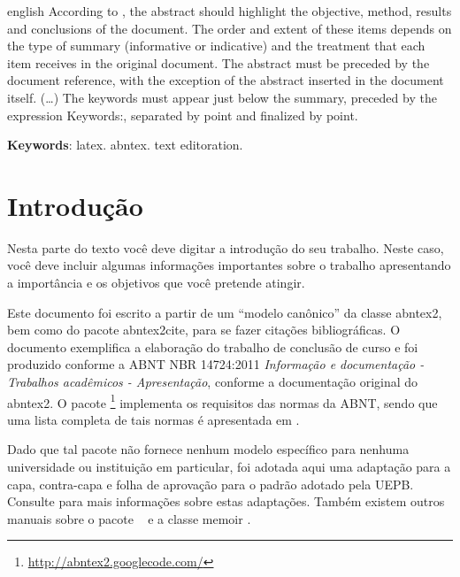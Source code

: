\documentclass[article,12pt,oneside,a4paper,chapter=TITLE,english,brazil]{abntex2}
\begin{document}
\begin{resumo}[Abstract]
	\begin{otherlanguage*}{english}
		According to , the abstract should highlight the objective, method, results and conclusions of the document. The order and extent of these items depends on the type of summary (informative or indicative) and the treatment that each item receives in the original document. The abstract must be preceded by the document reference, with the exception of the abstract inserted in the document itself. (\ldots) The keywords must appear just below the summary, preceded by the expression Keywords:, separated by point and finalized by point.
		
		\textbf{Keywords}: latex. abntex. text editoration.
	\end{otherlanguage*}
\end{resumo}
\vspace{\onelineskip}


\chapter{Introdução}
\label{introducao}

Nesta parte do texto você deve digitar a introdução do seu trabalho. Neste caso, você deve incluir algumas informações importantes sobre o trabalho apresentando a importância e os objetivos que você pretende atingir.

Este documento foi escrito a partir de um ``modelo canônico'' da classe \textsf{abntex2}, bem como do pacote \textsf{abntex2cite}, para se fazer citações bibliográficas. O documento exemplifica a elaboração do trabalho de conclusão de curso e foi produzido conforme a ABNT NBR 14724:2011 \emph{Informação e documentação - Trabalhos acadêmicos - Apresentação}, conforme a documentação original do \textsf{abntex2}. O pacote \abnTeX\footnote{\url{http://abntex2.googlecode.com/}} implementa os requisitos das normas da ABNT, sendo que uma lista completa de tais normas é apresentada em .

Dado que tal pacote não fornece nenhum modelo específico para nenhuma universidade ou instituição em particular, foi adotada aqui uma adaptação para a capa, contra-capa e folha de aprovação para o padrão adotado pela UEPB. Consulte  para mais informações sobre estas adaptações. Também existem outros manuais sobre o pacote \abnTeX\ \cite{abntex2classe,abntex2cite,abntex2cite-alf} e a classe \textsf{memoir} \cite{memoir}.
\end{document}
